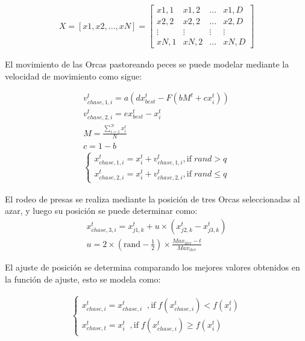 \documentclass[conference]{IEEEtran}
\begin{document}
\begin{equation}
\begin{gathered}
X = [ x1, x2, ..., xN ] =\begin{bmatrix}
  x1,1 & x1,2 & ... & x1,D  \\
  x2,2 & x2,2 & ... & x2,D  \\
  \vdots & \vdots & \vdots & \vdots \\
  xN,1 & xN,2 & ... & xN,D
\end{bmatrix}
\end{gathered}
\label{eq18}
\end{equation}

\noindent El movimiento de las Orcas pastoreando peces se puede modelar mediante la velocidad de movimiento como sigue:

\begin{equation}
\begin{gathered}
v_{chase,1,i}^t = a ( d x_{best}^t - F (b M^t + c x_i^t)) \\
v_{chase,2,i}^t = e x_{best}^t - x_{i}^t \\
M = \frac{\sum_{i=1}^{N} x_i^t}{N} \\
c=1-b \\
\begin{cases}
  x_{chase,1,i}^t = x_{i}^t + v_{chase,1,i}^t , \text{if} \;rand > q \\
  x_{chase,2,i}^t = x_{i}^t + v_{chase,2,i}^t  , \text{if} \;rand \leq q
\end{cases}
\end{gathered}
\label{eq19}
\end{equation}

\noindent El rodeo de presas se realiza mediante la posición de tres Orcas seleccionadas al azar, y luego su posición se puede determinar como:
\begin{equation}
\begin{gathered}
x_{chase,3,i}^t =x_{j1,k}^t +u \times (x_{j2,k}^t - x_{j3,k}^t ) \\
u = 2 \times (\text{rand} - \frac{1}{2}) \times \frac{Max_{iter}-t}{Max_{iter}}
\end{gathered}
\label{eq20}
\end{equation}

\noindent El ajuste de posición se determina comparando los mejores valores obtenidos en la función de ajuste, esto se modela como:

\begin{equation}
\begin{gathered}
\begin{cases}
  x_{chase,i}^t = x_{chase,i}^t \;\;, \text{if} \; f(x_{chase,i}^t) < f(x_{i}^t ) \\
  x_{chase,t}^t = x_{i}^t  \;\;, \text{if} \;f(x_{chase,i}^t) \geq f(x_{i}^t )
\end{cases}
\end{gathered}
\label{eq21}
\end{equation}
\end{document}
